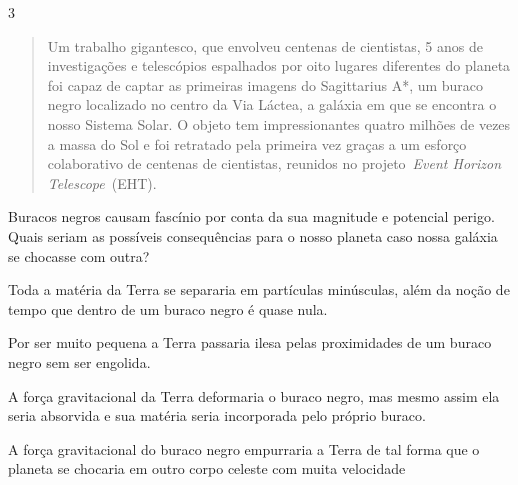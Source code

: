 {{\num{3}
\begin{quote}
Um trabalho gigantesco, que envolveu centenas de cientistas, 5 anos
de investigações e telescópios espalhados por oito lugares diferentes
do planeta foi capaz de captar as primeiras imagens do Sagittarius A*,
um buraco negro localizado no centro da Via Láctea, a galáxia em que
se encontra o nosso Sistema Solar. O objeto tem impressionantes quatro
milhões de vezes a massa do Sol e foi retratado pela primeira vez
graças a um esforço colaborativo de centenas de cientistas, reunidos
no projeto~\emph{Event Horizon Telescope}~(EHT).

\end{quote}

Buracos negros causam fascínio por conta da sua magnitude e potencial
perigo. Quais seriam as possíveis consequências para o nosso planeta
caso nossa galáxia se chocasse com outra?

\begin{escolha}
\item
  Toda a matéria da Terra se separaria em partículas minúsculas, além da
  noção de tempo que dentro de um buraco negro é quase nula.
\item
  Por ser muito pequena a Terra passaria ilesa pelas proximidades de um
  buraco negro sem ser engolida.
\item
  A força gravitacional da Terra deformaria o buraco negro, mas mesmo
  assim ela seria absorvida e sua matéria seria incorporada pelo próprio
  buraco.
\item
  A força gravitacional do buraco negro empurraria a Terra de tal forma
  que o planeta se chocaria em outro corpo celeste com muita velocidade
\end{escolha}


}}
